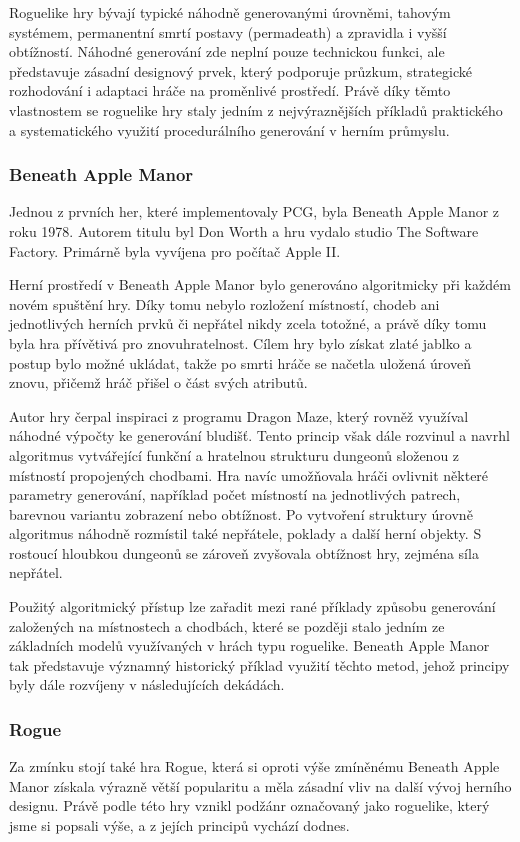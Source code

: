 \documentclass[
  program=itk,
  biblatex,
  figures=false,
  glossaries,
  index
]{kidiplom}
\begin{document}
Roguelike hry bývají typické náhodně generovanými úrovněmi, tahovým systémem, permanentní smrtí postavy (permadeath) a zpravidla i vyšší obtížností. Náhodné generování zde neplní pouze technickou funkci, ale představuje zásadní designový prvek, který podporuje průzkum, strategické rozhodování i adaptaci hráče na proměnlivé prostředí. Právě díky těmto vlastnostem se roguelike hry staly jedním z nejvýraznějších příkladů praktického a systematického využití procedurálního generování v herním průmyslu.

\subsubsection{Beneath Apple Manor}
Jednou z prvních her, které implementovaly PCG, byla Beneath Apple Manor z roku 1978. Autorem titulu byl Don Worth a hru vydalo studio The Software Factory. Primárně byla vyvíjena pro počítač Apple II.

Herní prostředí v Beneath Apple Manor bylo generováno algoritmicky při každém novém spuštění hry. Díky tomu nebylo rozložení místností, chodeb ani jednotlivých herních prvků či nepřátel nikdy zcela totožné, a právě díky tomu byla hra přívětivá pro znovuhratelnost. Cílem hry bylo získat zlaté jablko a postup bylo možné ukládat, takže po smrti hráče se načetla uložená úroveň znovu, přičemž hráč přišel o část svých atributů.

Autor hry čerpal inspiraci z programu Dragon Maze, který rovněž využíval náhodné výpočty ke generování bludišť. Tento princip však dále rozvinul a navrhl algoritmus vytvářející funkční a hratelnou strukturu dungeonů složenou z místností propojených chodbami. Hra navíc umožňovala hráči ovlivnit některé parametry generování, například počet místností na jednotlivých patrech, barevnou variantu zobrazení nebo obtížnost. Po vytvoření struktury úrovně algoritmus náhodně rozmístil také nepřátele, poklady a další herní objekty. S rostoucí hloubkou dungeonů se zároveň zvyšovala obtížnost hry, zejména síla nepřátel.

Použitý algoritmický přístup lze zařadit mezi rané příklady způsobu generování založených na místnostech a chodbách, které se později stalo jedním ze základních modelů využívaných v hrách typu roguelike. Beneath Apple Manor tak představuje významný historický příklad využití těchto metod, jehož principy byly dále rozvíjeny v následujících dekádách.

\subsubsection{Rogue}
Za zmínku stojí také hra Rogue, která si oproti výše zmíněnému Beneath Apple Manor získala výrazně větší popularitu a měla zásadní vliv na další vývoj herního designu. Právě podle této hry vznikl podžánr označovaný jako roguelike, který jsme si popsali výše, a z jejích principů vychází dodnes.
\end{document}

